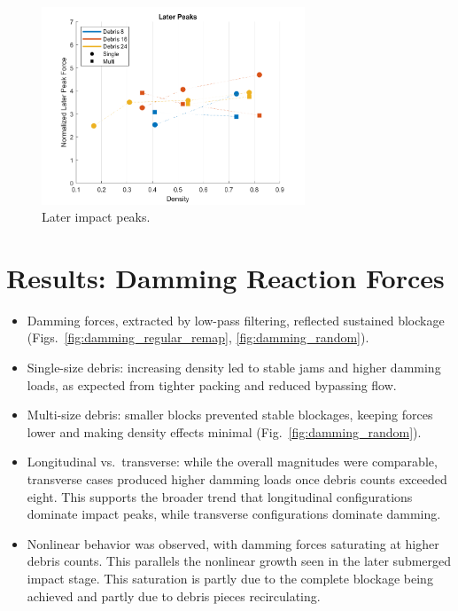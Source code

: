 \documentclass{article}
\begin{document}
\begin{figure}[htbp]
    \centering
    \includegraphics[width=0.7\textwidth]{Impact_LaterPeaks_densities_combined.png}
    \caption{Later impact peaks.}
    \label{fig:later_peaks_combined}
\end{figure}


\section{Results: Damming Reaction Forces}
\begin{itemize}
    \item Damming forces, extracted by low-pass filtering, reflected sustained blockage (Figs.~\ref{fig:damming_regular_remap}, \ref{fig:damming_random}).
    \item Single-size debris: increasing density led to stable jams and higher damming loads, as expected from tighter packing and reduced bypassing flow.
    \item Multi-size debris: smaller blocks prevented stable blockages, keeping forces lower and making density effects minimal (Fig.~\ref{fig:damming_random}).
    \item Longitudinal vs.\ transverse: while the overall magnitudes were comparable, transverse cases produced higher damming loads once debris counts exceeded eight. This supports the broader trend that longitudinal configurations dominate impact peaks, while transverse configurations dominate damming.
    \item Nonlinear behavior was observed, with damming forces saturating at higher debris counts. This parallels the nonlinear growth seen in the later submerged impact stage. This saturation is partly due to the complete blockage being achieved and partly due to debris pieces recirculating.
\end{itemize}
\end{document}
